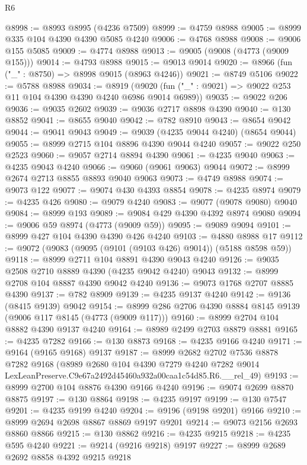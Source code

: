\begin{lexlean}{R6}
\begin{coremodule}
@8998 := @8993 @8995 (@4236 @7509)
@8999 := @4759 @8988
@9005 := @8999 @335 @104 @4390 @4390 @5085 @4240
@9006 := @4768 @8988
@9008 := @9006 @155 @5085
@9009 := @4774 @8988
@9013 := @9005 (@9008 (@4773 (@9009 @155)))
@9014 := @4793 @8988
@9015 := @9013 @9014
@9020 := @8966 (fun ("_" : @8750) => @8998 @9015 (@8963 @4246))
@9021 := @8749 @5106
@9022 := @5788 @8988
@9034 := @8919
    (@9020 (fun ("_" : @9021) => @9022 @253 @11 @104 @4390 @4390 @4240 @6986 @9014 @6989))
@9035 := @9022 @206
@9036 := @9035 @2602
@9039 := @9036 @2717 @8898 @4390
@9040 := @130 @8852
@9041 := @8655 @9040
@9042 := @782 @8910
@9043 := @8654 @9042
@9044 := @9041 @9043
@9049 := @9039 (@4235 @9044 @4240) (@8654 @9044)
@9055 := @8999 @2715 @104 @8896 @4390 @9044 @4240
@9057 := @9022 @250 @2523
@9060 := @9057 @2714 @8894 @4390
@9061 := @4235 @9040
@9063 := @4235 @9043 @4240
@9066 := @9060 (@9061 @9063) @9044
@9072 := @8999 @2674 @2713 @8855 @8893 @9040 @9063
@9073 := @4749 @8988
@9074 := @9073 @122
@9077 := @9074 @430 @4393 @8854
@9078 := @4235 @8974
@9079 := @4235 @426
@9080 := @9079 @4240
@9083 := @9077 (@9078 @9080) @9040
@9084 := @8999 @193
@9089 := @9084 @429 @4390 @4392 @8974 @9080
@9094 := @9006 @59 @8974 (@4773 (@9009 @59))
@9095 := @9089 @9094
@9101 := @8999 @427 @104 @4390 @4390 @426 @4240
@9103 := @4880 @8988 @17
@9112 := @9072 (@9083 (@9095 (@9101 (@9103 @426) @9014)) (@5188 @8598 @59))
@9118 := @8999 @2711 @104 @8891 @4390 @9043 @4240
@9126 := @9035 @2508 @2710 @8889 @4390 (@4235 @9042 @4240) @9043
@9132 := @8999 @2708 @104 @8887 @4390 @9042 @4240
@9136 := @9073 @1768 @2707 @8885 @4390
@9137 := @782 @8909
@9139 := @4235 @9137 @4240
@9142 := @9136 (@8415 @9139) @9042
@9154 := @8999 @286 @2706 @4390 @8884 @8145 @9139 (@9006 @117 @8145 (@4773 (@9009 @117)))
@9160 := @8999 @2704 @104 @8882 @4390 @9137 @4240
@9164 := @8989 @2499 @2703 @8879 @8881
@9165 := @4235 @7282
@9166 := @130 @8873
@9168 := @4235 @9166 @4240
@9171 := @9164 (@9165 @9168) @9137
@9187 := @8999
    @2682
    @2702
    @7536
    @8878
    @7282
    @9168
    (@8989
      @2680
      @104
      @4390
      @7279
      @4240
      @7282
      @9014
      LexLeanPreserve.C9e67a2492d45460a932a00caa1c54d85.R6.__rel_49)
@9193 := @8999 @2700 @104 @8876 @4390 @9166 @4240
@9196 := @9074 @2699 @8870 @8875
@9197 := @130 @8864
@9198 := @4235 @9197
@9199 := @130 @7547
@9201 := @4235 @9199 @4240
@9204 := @9196 (@9198 @9201) @9166
@9210 := @8999 @2694 @2698 @8867 @8869 @9197 @9201
@9214 := @9073 @2156 @2693 @8860 @8866
@9215 := @130 @8862
@9216 := @4235 @9215
@9218 := @4235 @595 @4240
@9221 := @9214 (@9216 @9218) @9197
@9227 := @8999 @2689 @2692 @8858 @4392 @9215 @9218

\end{coremodule}
\end{lexlean}
